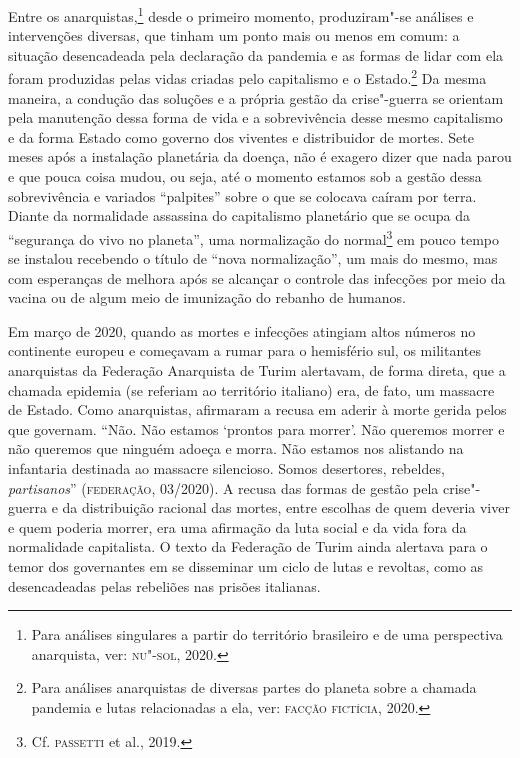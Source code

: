 Entre os anarquistas,\footnote{Para análises singulares a partir do
  território brasileiro e de uma perspectiva anarquista, ver: \textsc{nu}"-\textsc{sol},
  2020.} desde o primeiro momento, produziram"-se análises e intervenções
diversas, que tinham um ponto mais ou menos em comum: a situação
desencadeada pela declaração da pandemia e as formas de lidar com ela
foram produzidas pelas vidas criadas pelo capitalismo e o
Estado.\footnote{Para análises anarquistas de diversas partes do planeta
  sobre a chamada pandemia e lutas relacionadas a ela, ver: \textsc{facção}
  \textsc{fictícia}, 2020.} Da mesma maneira, a condução das soluções e a própria
gestão da crise"-guerra se orientam pela manutenção dessa forma de vida e
a sobrevivência desse mesmo capitalismo e da forma Estado como governo
dos viventes e distribuidor de mortes. Sete meses após a instalação
planetária da doença, não é exagero dizer que nada parou e que pouca
coisa mudou, ou seja, até o momento estamos sob a gestão dessa
sobrevivência e variados ``palpites'' sobre o que se colocava caíram por
terra. Diante da normalidade assassina do capitalismo planetário que se
ocupa da ``segurança do vivo no planeta'', uma normalização do
normal\footnote{Cf. \textsc{passetti} et al., 2019.} em pouco tempo se instalou
recebendo o título de ``nova normalização'', um mais do mesmo, mas com
esperanças de melhora após se alcançar o controle das infecções por meio
da vacina ou de algum meio de imunização do rebanho de humanos.

Em março de 2020, quando as mortes e infecções atingiam altos números no
continente europeu e começavam a rumar para o hemisfério sul, os
militantes anarquistas da Federação Anarquista de Turim alertavam, de
forma direta, que a chamada epidemia (se referiam ao território
italiano) era, de fato, um massacre de Estado. Como anarquistas,
afirmaram a recusa em aderir à morte gerida pelos que governam. ``Não.
Não estamos `prontos para morrer'. Não queremos morrer e não queremos
que ninguém adoeça e morra. Não estamos nos alistando na infantaria
destinada ao massacre silencioso. Somos desertores, rebeldes,
\emph{partisanos}'' (\textsc{federação}, 03/2020). A recusa das formas de gestão
pela crise"-guerra e da distribuição racional das mortes, entre escolhas
de quem deveria viver e quem poderia morrer, era uma afirmação da luta
social e da vida fora da normalidade capitalista. O texto da Federação
de Turim ainda alertava para o temor dos governantes em se disseminar um
ciclo de lutas e revoltas, como as desencadeadas pelas rebeliões nas
prisões italianas.

